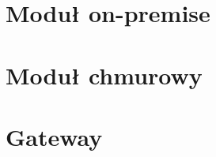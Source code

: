 \section{Moduł on-premise}\label{sec:on-premise}

%
%
%

\section{Moduł chmurowy}\label{sec:cloud}

%
%
%

\section{Gateway}\label{sec:gateway}

%
%
%

